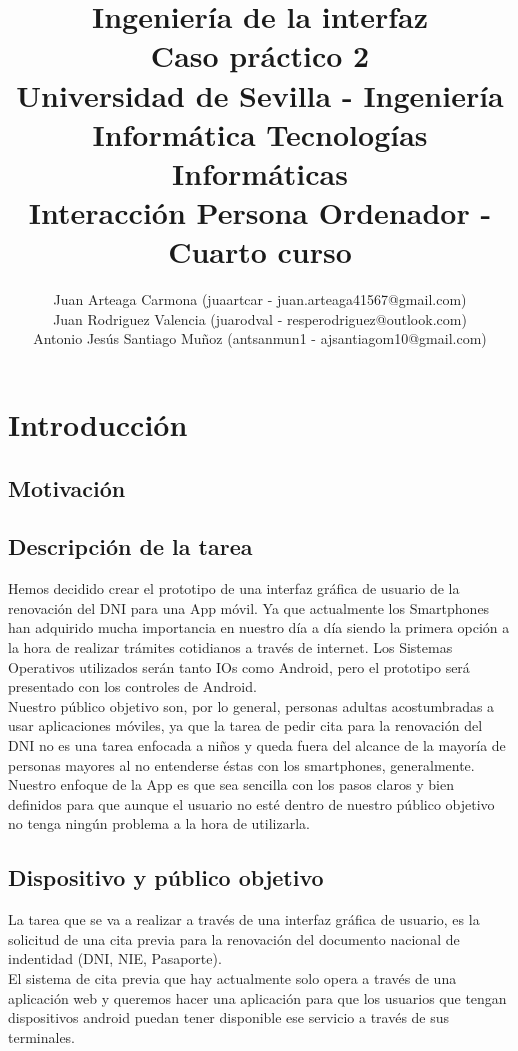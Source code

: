 \documentclass[a4paper,11pt]{article}
\title{
        \textbf{Ingeniería de la interfaz}\large\\
        \textbf{Caso práctico 2}\\
        \medskip
        Universidad de Sevilla - Ingeniería Informática Tecnologías Informáticas\\
        Interacción Persona Ordenador - Cuarto curso}
\author{Juan Arteaga Carmona (juaartcar - juan.arteaga41567@gmail.com)\\
        Juan Rodriguez Valencia (juarodval - resperodriguez@outlook.com)\\
        Antonio Jesús Santiago Muñoz (antsanmun1 - ajsantiagom10@gmail.com)\\
}
\begin{document}
\maketitle

\newpage
\tableofcontents
\listoffigures
\newpage



\section{Introducción}
\subsection{Motivación}
\subsection{Descripción de la tarea}
Hemos decidido crear el prototipo de una interfaz gráfica de usuario de la renovación del DNI para una App móvil. Ya que actualmente los Smartphones han adquirido mucha importancia en nuestro día a día siendo la primera opción a la hora de realizar trámites cotidianos a través de internet. Los Sistemas Operativos utilizados serán tanto IOs como Android, pero el prototipo será presentado con los controles de Android.\\

Nuestro público objetivo son, por lo general, personas adultas acostumbradas a usar aplicaciones móviles, ya que la tarea de pedir cita para la renovación del DNI no es una tarea enfocada a niños y queda fuera del alcance de la mayoría de personas mayores al no entenderse éstas con los smartphones, generalmente. Nuestro enfoque de la App es que sea sencilla con los pasos claros y bien definidos para que aunque el usuario no esté dentro de nuestro público objetivo no tenga ningún problema a la hora de utilizarla.


\subsection{Dispositivo y público objetivo}
La tarea que se va a realizar a través de una interfaz gráfica de usuario, es la solicitud de una cita previa para la renovación del documento nacional de indentidad (DNI, NIE, Pasaporte).\\
  El sistema de cita previa que hay actualmente solo opera a través de una aplicación web y queremos hacer una aplicación para que los usuarios que tengan dispositivos android puedan tener disponible ese servicio a través de sus terminales.
\end{document}
